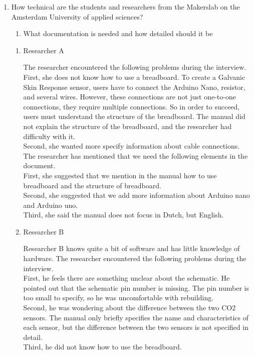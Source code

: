 \documentclass[conference]{IEEEtran}
\begin{document}
		\begin{enumerate}
			\item How technical are the students and researchers from the Makerslab on the Amsterdam University of applied sciences?
				\begin{enumerate}
					\item What documentation is needed and how detailed should it be
				\end{enumerate}


				\begin{enumerate}
					\item Researcher A

						The researcher encountered the following problems during the interview.\\

						First, she does not know how to use a breadboard. To create a Galvanic Skin Response sensor, users have to connect the Arduino Nano, resistor, and several wires. However, these connections are not just one-to-one connections, they require multiple connections. So in order to succeed, users must understand the structure of the breadboard. The manual did not explain the structure of the breadboard, and the researcher had difficulty with it.\\
						Second, she wanted more specify information about cable connections.\\
		 		
						The researcher has mentioned that we need the following elements in the document.\\

						First, she suggested that we mention in the manual how to use breadboard and the structure of breadboard. \\
						Second, she suggested that we add more information about Arduino nano and Arduino uno.\\
						Third, she said the manual does not focus in Dutch, but English. \\
		
					\item Researcher B

						Researcher B knows quite a bit of software and has little knowledge of hardware. The researcher encountered the following problems during the interview.\\

						First, he feels there are something unclear about the schematic. 						He pointed out that the schematic pin number is missing. The pin number is too small to specify, so he was uncomfortable with rebuilding.\\
						Second, he was wondering about the difference between the two CO2 sensors. The manual only briefly specifies the name and characteristics of each sensor, but the difference between the two sensors is not specified in detail.\\
						Third, he did not know how to use the breadboard.\\


\end{enumerate}
\end{enumerate}
\end{document}
